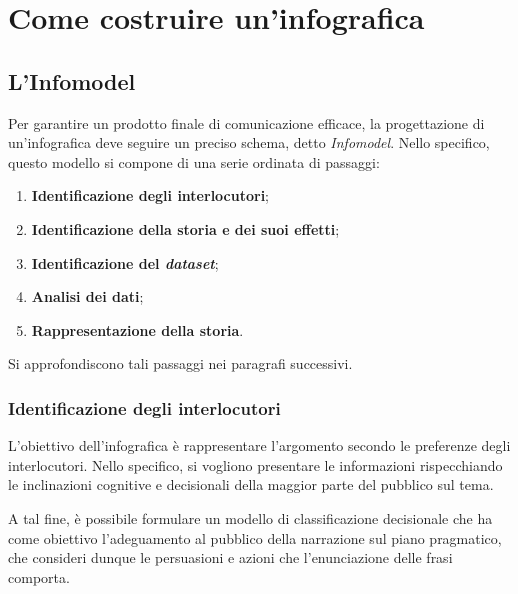 \section{Come costruire un'infografica}
\subsection{L'Infomodel}
Per garantire un prodotto finale di comunicazione efficace, la progettazione di un'infografica deve seguire un preciso schema, detto \emph{Infomodel}. 
Nello specifico, questo modello si compone di una serie ordinata di passaggi:
\begin{enumerate}
    \item \textbf{Identificazione degli interlocutori};
    \item \textbf{Identificazione della storia e dei suoi effetti};
    \item \textbf{Identificazione del \emph{dataset}};
    \item \textbf{Analisi dei dati};
    \item \textbf{Rappresentazione della storia}.
\end{enumerate}
Si approfondiscono tali passaggi nei paragrafi successivi.

\subsubsection{Identificazione degli interlocutori}
L'obiettivo dell'infografica è rappresentare l'argomento secondo le preferenze degli interlocutori. Nello specifico, si vogliono presentare le informazioni 
rispecchiando le inclinazioni cognitive e decisionali della maggior parte del pubblico sul tema.

A tal fine, è possibile formulare un modello di classificazione decisionale che ha come obiettivo l'adeguamento al pubblico della narrazione sul piano pragmatico,
che consideri dunque le persuasioni e azioni che l'enunciazione delle frasi comporta. 


